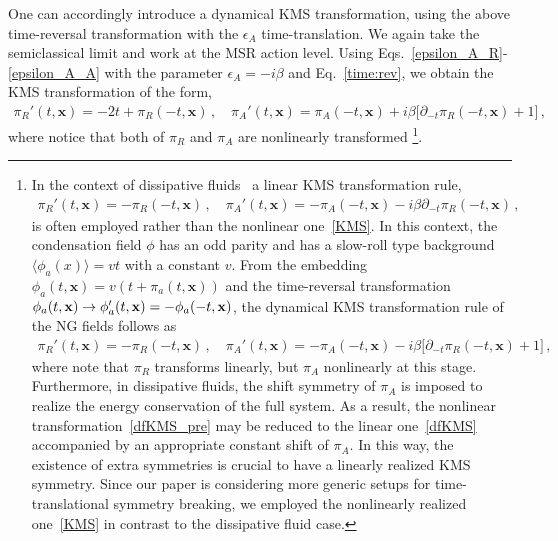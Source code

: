 \documentclass[a4paper,11pt]{article}
\begin{document}
\medskip
One can accordingly introduce a dynamical KMS transformation, using the above time-reversal transformation with the $\epsilon_A$ time-translation. 
We again take the semiclassical limit and work at the MSR action level. 
Using Eqs.~\eqref{epsilon_A_R}-\eqref{epsilon_A_A} with the parameter $\epsilon_A=-i\beta$ and Eq.~\eqref{time:rev}, we obtain the KMS transformation of the form,
\begin{align}
\label{KMS}
 \pi_R'(t,\mathbf x) =-2t+\pi_R(-t,\mathbf x)
 \,,
 \quad
 \pi_A'(t,\mathbf x) = 
 \pi_A(-t,\mathbf x) 
 + i\beta \big[\partial_{-t} \pi_R(-t,\mathbf x)+1\big]\,,
\end{align}
where notice that both of $\pi_R$ and $\pi_A$ are nonlinearly transformed
\footnote{
In the context of dissipative fluids~\cite{Glorioso:2017fpd} a linear KMS transformation rule,
\begin{align}
\label{dfKMS}
\pi_R'(t,\mathbf x) =-\pi_R(-t,\mathbf x)
 \,,
 \quad
 \pi_A'(t,\mathbf x) = 
 -\pi_A(-t,\mathbf x) 
 - i\beta \partial_{-t} \pi_R(-t,\mathbf x)\,,
\end{align}
is often employed rather than the nonlinear one~\eqref{KMS}. In this context, the condensation field $\phi$ has an odd parity and has a slow-roll type background $\langle\phi_a(x)\rangle=vt$ with a constant $v$. From the embedding $\phi_a(t,\mathbf x)=v(t+\pi_a(t,\mathbf x))$ and the time-reversal transformation $\phi_a(t,{\bf x})\to\phi_a'(t,{\bf x})=-\phi_a(-t,{\bf x})$, the dynamical KMS transformation rule of the NG fields follows as
\begin{align}
\label{dfKMS_pre}
 \pi_R'(t,\mathbf x) =-\pi_R(-t,\mathbf x)
 \,,
 \quad
 \pi_A'(t,\mathbf x) = 
 -\pi_A(-t,\mathbf x) 
 - i\beta \big[\partial_{-t} \pi_R(-t,\mathbf x)+1\big]\,,
\end{align}
where note that $\pi_R$ transforms linearly, but $\pi_A$ nonlinearly at this stage. Furthermore, in dissipative fluids, the shift symmetry of $\pi_A$ is imposed to realize the energy conservation of the full system. As a result, the nonlinear transformation~\eqref{dfKMS_pre} may be reduced to the linear one~\eqref{dfKMS} accompanied by an appropriate constant shift of $\pi_A$. In this way, the existence of extra symmetries is crucial to have a linearly realized KMS symmetry. Since our paper is considering more generic setups for time-translational symmetry breaking, we employed the nonlinearly realized one~\eqref{KMS} in contrast to the dissipative fluid case.}.
\end{document}
